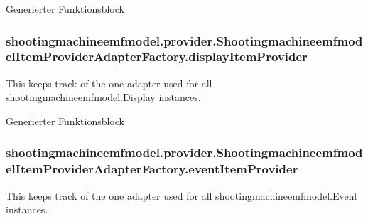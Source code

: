 Generierter Funktionsblock \hypertarget{classshootingmachineemfmodel_1_1provider_1_1_shootingmachineemfmodel_item_provider_adapter_factory_abed64251d753a775ee21b8cf1d23855b}{
\subsubsection[{display\-Item\-Provider}]{ shootingmachineemfmodel.\-provider.\-Shootingmachineemfmodel\-Item\-Provider\-Adapter\-Factory.\-display\-Item\-Provider\hspace{0.3cm}{\ttfamily [protected]}}}\label{classshootingmachineemfmodel_1_1provider_1_1_shootingmachineemfmodel_item_provider_adapter_factory_abed64251d753a775ee21b8cf1d23855b}
This keeps track of the one adapter used for all \hyperlink{interfaceshootingmachineemfmodel_1_1_display}{shootingmachineemfmodel.\-Display} instances.

Generierter Funktionsblock \hypertarget{classshootingmachineemfmodel_1_1provider_1_1_shootingmachineemfmodel_item_provider_adapter_factory_ad5408b5a39d6585dfe277b101fcf41ab}{
\subsubsection[{event\-Item\-Provider}]{ shootingmachineemfmodel.\-provider.\-Shootingmachineemfmodel\-Item\-Provider\-Adapter\-Factory.\-event\-Item\-Provider\hspace{0.3cm}{\ttfamily [protected]}}}\label{classshootingmachineemfmodel_1_1provider_1_1_shootingmachineemfmodel_item_provider_adapter_factory_ad5408b5a39d6585dfe277b101fcf41ab}
This keeps track of the one adapter used for all \hyperlink{interfaceshootingmachineemfmodel_1_1_event}{shootingmachineemfmodel.\-Event} instances.

